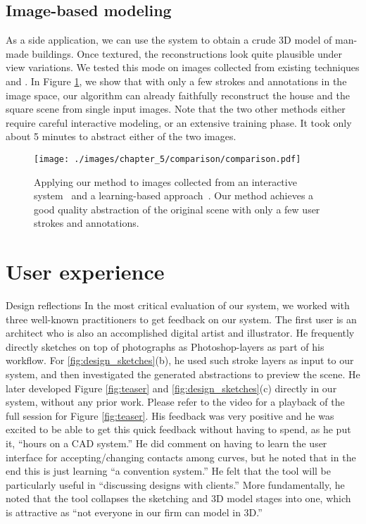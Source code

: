 {\subsection{Image-based modeling}

As a side application, we can use the system to obtain a crude 3D model of man-made buildings. Once textured, the reconstructions look quite plausible under view variations. We tested this mode on images collected from existing techniques \cite{Sinha:2008:IAM} and \cite{SaxenaSN09}. In Figure \ref{fig:comparison}, we show that with only a few strokes and annotations in the image space, our algorithm can already faithfully reconstruct the house and the square scene from single input images. Note that the two other methods either require careful interactive modeling, or an extensive training phase. It took only about 5 minutes to abstract either of the two images.


\begin{figure}
  \texttt{[image: ./images/chapter\_5/comparison/comparison.pdf]}
  \caption{Applying our method to images collected from an interactive system~\protect\cite{Sinha:2008:IAM} and a learning-based approach~\protect\cite{SaxenaSN09}. Our method achieves a good quality abstraction of the original scene with only a few user strokes and annotations.
  \label{fig:comparison}
  }
  \vnudge
\end{figure}



\section{User experience}

{Design reflections}
In the most critical evaluation of our system, we worked with three well-known practitioners to get feedback on our system.
%
%
The first user is an architect who is also an accomplished digital artist and illustrator. He frequently directly sketches on top of photographs as Photoshop-layers as part of his workflow. %
%
For \ref{fig:design_sketches}(b), he used such stroke layers as input to our system, and then investigated the generated abstractions to preview the scene.
%
He later developed Figure \ref{fig:teaser} and \ref{fig:design_sketches}(c) directly in our system, without any prior work. Please refer to the video for a playback of the full session for Figure \ref{fig:teaser}.
%
His feedback was very positive and he was excited to be able to get this quick feedback without having to spend, as he put it, ``hours on a CAD system.''  He did comment on having to learn the user interface for accepting/changing contacts among curves, but he noted that in the end this is just learning ``a convention system.''
%
He felt that the tool will be particularly useful in ``discussing designs with clients.''  More fundamentally, he noted that the tool collapses the sketching and 3D model stages into one, which is attractive as ``not everyone in our firm can model in 3D.''
%

}
